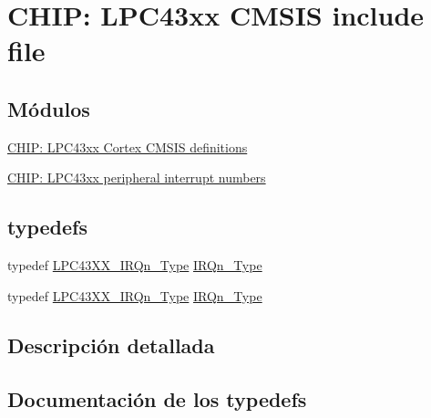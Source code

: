 \hypertarget{group___c_m_s_i_s__43_x_x}{}\section{C\+H\+IP\+: L\+P\+C43xx C\+M\+S\+IS include file}
\label{group___c_m_s_i_s__43_x_x}
\subsection*{Módulos}
\begin{DoxyCompactItemize}
\item 
\hyperlink{group___c_m_s_i_s__43_x_x___c_o_m_m_o_n}{C\+H\+I\+P\+: L\+P\+C43xx Cortex C\+M\+S\+I\+S definitions}
\item 
\hyperlink{group___c_m_s_i_s__43_x_x___i_r_q}{C\+H\+I\+P\+: L\+P\+C43xx peripheral interrupt numbers}
\end{DoxyCompactItemize}
\subsection*{\textquotesingle{}typedefs\textquotesingle{}}
\begin{DoxyCompactItemize}
\item 
typedef \hyperlink{group___c_m_s_i_s__43_x_x___i_r_q_ga2018a6433701e9ee9b34797425127919}{L\+P\+C43\+X\+X\+\_\+\+I\+R\+Qn\+\_\+\+Type} \hyperlink{group___c_m_s_i_s__43_x_x_gaebc4a3c3b7989735c473aa4e077cb4a2}{I\+R\+Qn\+\_\+\+Type}
\item 
typedef \hyperlink{group___c_m_s_i_s__43_x_x___i_r_q_ga2018a6433701e9ee9b34797425127919}{L\+P\+C43\+X\+X\+\_\+\+I\+R\+Qn\+\_\+\+Type} \hyperlink{group___c_m_s_i_s__43_x_x_gaebc4a3c3b7989735c473aa4e077cb4a2}{I\+R\+Qn\+\_\+\+Type}
\end{DoxyCompactItemize}


\subsection{Descripción detallada}


\subsection{Documentación de los \textquotesingle{}typedefs\textquotesingle{}}
